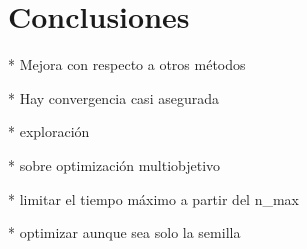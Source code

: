 \chapter{Conclusiones}

* Mejora con respecto a otros métodos

* Hay convergencia casi asegurada

* exploración

* sobre optimización multiobjetivo

* limitar el tiempo máximo a partir del n_max

* optimizar aunque sea solo la semilla 

